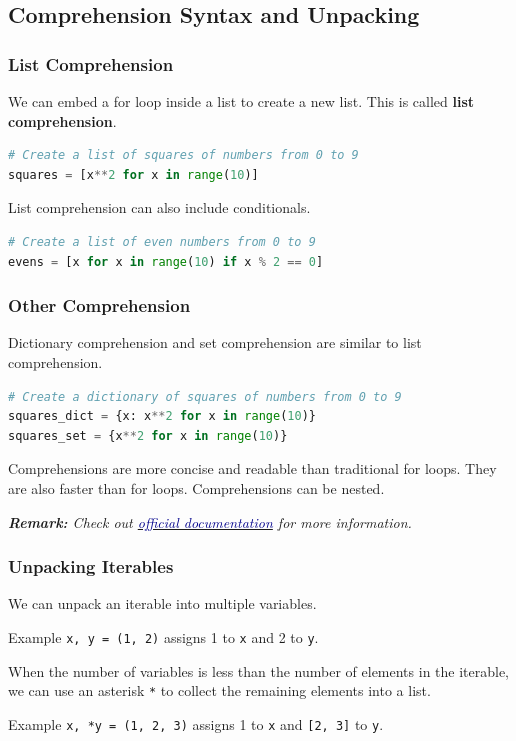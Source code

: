 \documentclass[beamer, en, version=2.0]{huangfusl-template}
\begin{document}
    \subsection{Comprehension Syntax and Unpacking}
    \begin{frame}[fragile]
        \frametitle{List Comprehension}

        We can embed a for loop inside a list to create a new list. This is called \textbf{list comprehension}.

\begin{lstlisting}[language=python]
# Create a list of squares of numbers from 0 to 9
squares = [x**2 for x in range(10)]
\end{lstlisting}

        List comprehension can also include conditionals.

\begin{lstlisting}[language=python]
# Create a list of even numbers from 0 to 9
evens = [x for x in range(10) if x % 2 == 0]
\end{lstlisting}

    \end{frame}
    \begin{frame}[fragile]
        \frametitle{Other Comprehension}

        Dictionary comprehension and set comprehension are similar to list comprehension.

\begin{lstlisting}[language=python]
# Create a dictionary of squares of numbers from 0 to 9
squares_dict = {x: x**2 for x in range(10)}
squares_set = {x**2 for x in range(10)}
\end{lstlisting}

        Comprehensions are more concise and readable than traditional for loops. They are also faster than for loops. Comprehensions can be nested.

        {\footnotesize\itshape\textbf{Remark:} Check out \href{https://docs.python.org/3/tutorial/datastructures.html#list-comprehensions}{\textcolor{darkblue}{official documentation}} for more information.}
    \end{frame}
    \begin{frame}[fragile]
        \frametitle{Unpacking Iterables}

        We can unpack an iterable into multiple variables.

        \begin{block}{Example}
            {\footnotesize\verb|x, y = (1, 2)|} assigns 1 to {\footnotesize\verb|x|} and 2 to {\footnotesize\verb|y|}.
        \end{block}

        When the number of variables is less than the number of elements in the iterable, we can use an asterisk {\footnotesize\verb|*|} to collect the remaining elements into a list.

        \begin{block}{Example}
            {\footnotesize\verb|x, *y = (1, 2, 3)|} assigns 1 to {\footnotesize\verb|x|} and {\footnotesize\verb|[2, 3]|} to {\footnotesize\verb|y|}.
        \end{block}
    \end{frame}
\end{document}
